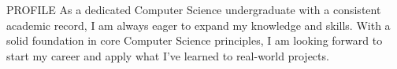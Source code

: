 \documentclass{resume} %
\begin{document}



\begin{rSection}{PROFILE}
{
    As a dedicated Computer Science undergraduate 
    with a consistent 
    academic record, I am always eager to expand my knowledge 
    and skills. With a solid foundation in core Computer Science
    principles, I am looking forward to start my career and 
     apply what I've learned to real-world projects.
}

\end{rSection}
\end{document}
